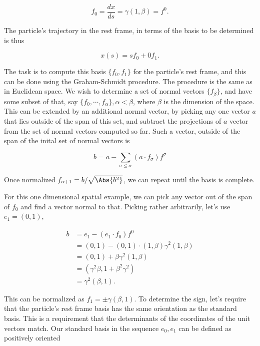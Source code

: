 \documentclass[iop,tighten]{emulateapj}
\begin{document}
\begin{equation}\label{eqn:grahamSchmidtLorentz:620}
f_0 = \frac{dx}{ds} = \gamma (1, \beta) = f^0.
\end{equation}

The particle's trajectory in the rest frame, in terms of the basis to be determined is thus

\begin{equation}\label{eqn:grahamSchmidtLorentz:640}
x(s) = s f_0 + 0 f_1.
\end{equation}

The task is to compute this basis $\{f_0, f_1\}$ for the particle's rest frame, and this can be done using the Graham-Schmidt procedure.  The procedure is the same as in Euclidean space.  We wish to determine a set of normal vectors $\{f_\beta\}$, and have some subset of that, say $\{f_0, \cdots, f_\alpha\}, \alpha < \beta$, where $\beta$ is the dimension of the space.  This can be extended by an additional normal vector, by picking any one vector $a$ that lies outside of the span of this set, and subtract the projections of $a$ vector from the set of normal vectors computed so far.  Such a vector, outside of the span of the inital set of normal vectors is

\begin{equation}\label{eqn:grahamSchmidtLorentz:660}
b = a - \sum_{\sigma \le \alpha} (a \cdot f_\sigma) f^\sigma
\end{equation}

Once normalized $f_{\alpha+1} = b/\sqrt{\Abs{b^2}}$, we can repeat until the basis is complete.

For this one dimensional spatial example, we can pick any vector out of the span of $f_0$ and find a vector normal to that.  Picking rather arbitrarily, let's use $e_1 = (0, 1)$, 

\begin{align*}
b 
&= e_1 - (e_1 \cdot f_0) f^0 \\
&= (0, 1) - (0, 1) \cdot (1, \beta) \gamma^2 (1, \beta) \\
&= (0, 1) + \beta \gamma^2 (1, \beta) \\
&= (\gamma^2 \beta, 1 + \beta^2 \gamma^2) \\
&= \gamma^2 (\beta, 1 ).
\end{align*}

This can be normalized as $f_1 = \pm \gamma(\beta, 1)$.  To determine the sign, let's require that the particle's rest frame basis has the same orientation as the standard basis.  This is a requirement that the determinants of the coordinates of the unit vectors match.  Our standard basis in the sequence $e_0, e_1$ can be defined as positively oriented
\end{document}

